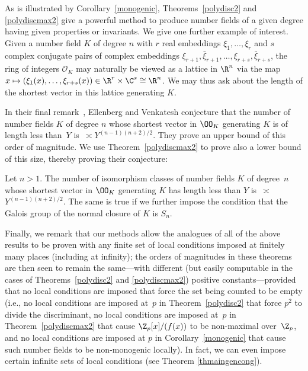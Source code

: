 As is illustrated by Corollary~\ref{monogenic},
Theorems~\ref{polydisc2} and \ref{polydiscmax2} give a powerful method
to produce number fields of a given degree having given properties or
invariants.  We give one further example of interest.  Given a number
field $K$ of degree $n$ with $r$ real embeddings $\xi_1,\dots,\xi_r$
and $s$ complex conjugate pairs of complex embeddings
$\xi_{r+1},\bar\xi_{r+1},\ldots,\xi_{r+s},\bar\xi_{r+s}$, the ring of
integers $\mathcal O_K$ may naturally be viewed as a lattice in $\R^n$
via the map $x\mapsto (\xi_1(x),\ldots,\xi_{r+s}(x))\in
\R^r\times\C^s\cong \R^n$.  We may thus ask about the length of the
shortest vector in this lattice generating $K$.

In their final remark~\cite[Remark~3.3]{EV}, Ellenberg and Venkatesh
conjecture that the number of number fields $K$ of degree $n$ whose
shortest vector in $\OO_K$ generating $K$ is of length less than~$Y$
is $\,\asymp Y^{(n-1)(n+2)/2}$. They prove an upper bound of this
order of magnitude.  We use Theorem~\ref{polydiscmax2} to prove also a
lower bound of this size, thereby proving their conjecture:

\begin{corollary}
\notready\label{shortvector}
Let $n>1$.  The number of isomorphism classes of number fields $K$ of
degree~$n$ whose shortest vector in
$\OO_K$ generating $K$ has length less than $Y$ is $\,\asymp$
$Y^{(n-1)(n+2)/2}$.  The same is true if we further impose the
condition that the Galois group of the normal closure of $K$ is $S_n$.
\end{corollary}


Finally, we remark that our methods allow the analogues of all of the
above results to be proven with any finite set of local conditions
imposed at finitely many places (including at infinity); the orders of
magnitudes in these theorems are then seen to remain the same---with
different (but easily computable in the cases of
Theorems~\ref{polydisc2} and \ref{polydiscmax2}) positive
constants---provided that no local conditions are imposed that force
the set being counted to be empty (i.e., no local conditions are
imposed at~$p$ in Theorem~\ref{polydisc2} that force $p^2$ to divide
the discriminant, no local conditions are imposed at~$p$ in
Theorem~\ref{polydiscmax2} that cause $\Z_p[x]/(f(x))$ to be
non-maximal over~$\Z_p$, and no local conditions are imposed at $p$ in
Corollary~\ref{monogenic} that cause such number fields to be
non-monogenic locally). In fact, we can even impose certain infinite
sets of local conditions (see Theorem \ref{thmaingencong}).



